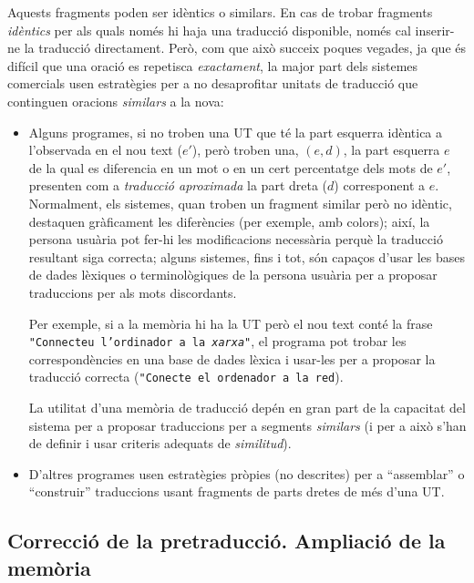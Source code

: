 Aquests fragments poden ser idèntics o similars. En cas de trobar
fragments \emph{idèntics} per als quals només hi haja una traducció
disponible, només cal inserir-ne la traducció directament. Però, com
que això succeix poques vegades, ja que és difícil que una oració es
repetisca \emph{exactament}, la major part dels sistemes comercials
usen estratègies per a no desaprofitar unitats de traducció que
continguen oracions \emph{similars} a la nova:
\begin{itemize}
\item Alguns programes, si no troben una UT que té la part esquerra
  idèntica a l'observada en el nou text ($e'$), però troben una,
  $(e,d)$, la part esquerra $e$ de la qual es diferencia en un mot o
  en un cert percentatge dels mots de $e'$, presenten com a
  \emph{traducció aproximada} la part dreta ($d$) corresponent a $e$.
  Normalment, els sistemes, quan troben un fragment similar però no
  idèntic, destaquen gràficament les diferències (per exemple, amb
  colors); així, la persona usuària pot fer-hi les modificacions
  necessària perquè la traducció resultant siga correcta; alguns
  sistemes, fins i tot, són capaços d'usar les bases de dades lèxiques
  o terminològiques de la persona usuària per a proposar traduccions
  per als mots discordants.
  
  Per exemple, si a la memòria hi ha la UT  però el nou text conté la frase \texttt{"{}Connecteu
  l'ordinador a la \emph{xarxa}"}, el programa pot trobar les
  correspondències 
   en una base de dades lèxica i usar-les per a
  proposar la traducció correcta (\texttt{"{}Conecte el ordenador a la
  red}).

La utilitat d'una memòria de traducció depén en gran part de la
capacitat del sistema per a proposar traduccions per a segments {\em
  similars} (i per a això s'han de definir i usar criteris adequats
de \emph{similitud}). 


\item D'altres programes usen estratègies pròpies (no descrites) per a
  ``assemblar'' o ``construir'' traduccions usant fragments de parts
  dretes de més d'una UT.

\end{itemize}

\subsection{Correcció de la pretraducció. Ampliació de la memòria}

